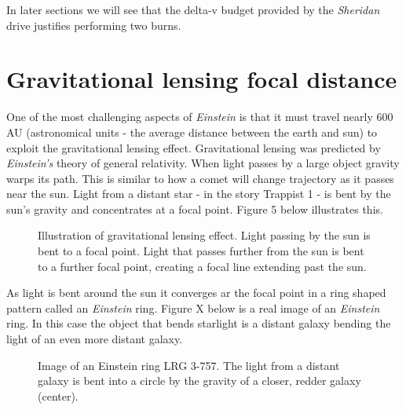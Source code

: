 \documentclass[12pt]{article} %
\begin{document}
In later sections we will see that the delta-v budget provided by the \textit{Sheridan} drive justifies performing two burns.


\section{Gravitational lensing focal distance}
One of the most challenging aspects of \textit{Einstein} is that it must travel nearly 600 AU (astronomical units - the average distance between the earth and sun) to exploit the gravitational lensing effect. Gravitational lensing was predicted by \textit{Einstein's} theory of general relativity. When light passes by a large object gravity warps its path. This is similar to how a comet will change trajectory as it passes near the sun. Light from a distant star - in the story Trappist 1 - is bent by the sun's gravity and concentrates at a focal point. Figure 5 below illustrates this.

\begin{figure}[H]

\caption{Illustration of gravitational lensing effect. Light passing by the sun is bent to a focal point. Light that passes further from the sun is bent to a further focal point, creating a focal line extending past the sun.}
\end{figure}

As light is bent around the sun it converges ar the focal point in a ring shaped pattern called an \textit{Einstein} ring. Figure X below is a real image of an \textit{Einstein} ring. In this case the object that bends starlight is a distant galaxy bending the light of an even more distant galaxy. 

\begin{figure}[H]
\caption{Image of an Einstein ring LRG 3-757. The light from a distant galaxy is bent into a circle by the gravity of a closer, redder galaxy (center).}
\end{figure}
\end{document}
